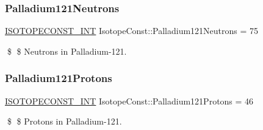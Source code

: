 \subsubsection{\texorpdfstring{Palladium121\+Neutrons}{Palladium121Neutrons}}
{\footnotesize\ttfamily \mbox{\hyperlink{group___isotope_const-_macros_ga5f18360b3e99483a35c32d789e62621c}{I\+S\+O\+T\+O\+P\+E\+C\+O\+N\+S\+T\+\_\+\+I\+NT}} Isotope\+Const\+::\+Palladium121\+Neutrons = 75}

\$ \$ Neutrons in Palladium-\/121. \mbox{\label{group___isotope_const-_palladium-_pd121_ga6b33ae60880d08122fcad784c926c676}} 
\subsubsection{\texorpdfstring{Palladium121\+Protons}{Palladium121Protons}}
{\footnotesize\ttfamily \mbox{\hyperlink{group___isotope_const-_macros_ga5f18360b3e99483a35c32d789e62621c}{I\+S\+O\+T\+O\+P\+E\+C\+O\+N\+S\+T\+\_\+\+I\+NT}} Isotope\+Const\+::\+Palladium121\+Protons = 46}

\$ \$ Protons in Palladium-\/121. 